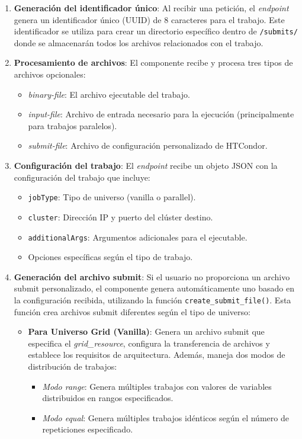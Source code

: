 \begin{enumerate}
	\item \textbf{Generación del identificador único}: Al recibir una petición, el \textit{endpoint} genera un identificador único (UUID) de 8 caracteres para el trabajo. Este identificador se utiliza para crear un directorio específico dentro de \texttt{/submits/} donde se almacenarán todos los archivos relacionados con el trabajo.
	
	\item \textbf{Procesamiento de archivos}: El componente recibe y procesa tres tipos de archivos opcionales:
	\begin{itemize}
		\item \textit{binary-file}: El archivo ejecutable del trabajo.
		\item \textit{input-file}: Archivo de entrada necesario para la ejecución (principalmente para trabajos paralelos).
		\item \textit{submit-file}: Archivo de configuración personalizado de HTCondor.
	\end{itemize}
	
	\item \textbf{Configuración del trabajo}: El \textit{endpoint} recibe un objeto JSON con la configuración del trabajo que incluye:
	\begin{itemize}
		\item \texttt{jobType}: Tipo de universo (vanilla o parallel).
		\item \texttt{cluster}: Dirección IP y puerto del clúster destino.
		\item \texttt{additionalArgs}: Argumentos adicionales para el ejecutable.
		\item Opciones específicas según el tipo de trabajo.
	\end{itemize}
	
	\item \textbf{Generación del archivo submit}: Si el usuario no proporciona un archivo submit personalizado, el componente genera automáticamente uno basado en la configuración recibida, utilizando la función \texttt{create\_submit\_file()}. Esta función crea archivos submit diferentes según el tipo de universo:
	
	\begin{itemize}
		\item \textbf{Para Universo Grid (Vanilla)}: Genera un archivo submit que especifica el \textit{grid\_resource}, configura la transferencia de archivos y establece los requisitos de arquitectura. Además, maneja dos modos de distribución de trabajos:
		\begin{itemize}
			\item \textit{Modo range}: Genera múltiples trabajos con valores de variables distribuidos en rangos especificados.
			\item \textit{Modo equal}: Genera múltiples trabajos idénticos según el número de repeticiones especificado.
		\end{itemize}
		

\end{itemize}
\end{enumerate}
